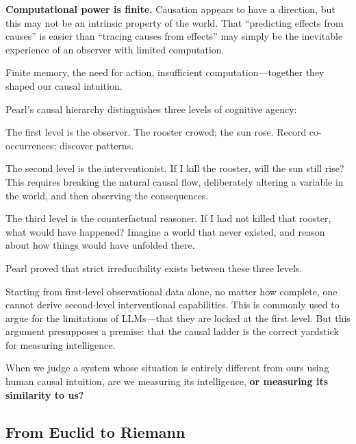 \textbf{Computational power is finite.} Causation appears to have a direction, but this may not be an intrinsic property of the world. That ``predicting effects from causes'' is easier than ``tracing causes from effects'' may simply be the inevitable experience of an observer with limited computation.

Finite memory, the need for action, insufficient computation---together they shaped our causal intuition.

\vspace{1em}

Pearl's causal hierarchy distinguishes three levels of cognitive agency:

\begin{myquote}
The first level is the observer. The rooster crowed; the sun rose. Record co-occurrences; discover patterns.

\vspace{1em}

The second level is the interventionist. If I kill the rooster, will the sun still rise?
This requires breaking the natural causal flow, deliberately altering a variable in the world, and then observing the consequences.

\vspace{1em}

The third level is the counterfactual reasoner. If I had not killed that rooster, what would have happened?
Imagine a world that never existed, and reason about how things would have unfolded there.
\end{myquote}

Pearl proved that strict irreducibility exists between these three levels.

Starting from first-level observational data alone, no matter how complete, one cannot derive second-level interventional capabilities. This is commonly used to argue for the limitations of LLMs---that they are locked at the first level. But this argument presupposes a premise: that the causal ladder is the correct yardstick for measuring intelligence.

\vspace{1em}

When we judge a system whose situation is entirely different from ours using human causal intuition, are we measuring its intelligence, \textbf{or measuring its similarity to us?}


\newpage
\subsection{From Euclid to Riemann}

